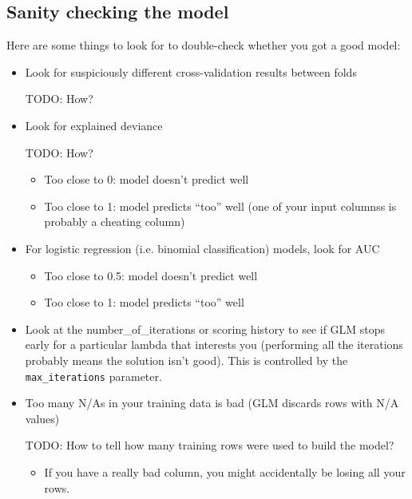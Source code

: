 \subsection{Sanity checking the model}

Here are some things to look for to double-check whether you got a good model:

\begin{itemize}
\item Look for suspiciously different cross-validation results between folds

TODO: How?

\item Look for explained deviance

TODO: How?

      \begin{itemize}
      \item Too close to 0:  model doesn’t predict well
      \item Too close to 1:  model predicts “too” well (one of your input columnss is probably a cheating column)
      \end{itemize}
\item For logistic regression (i.e. binomial classification) models, look for AUC
      \begin{itemize}
      \item Too close to 0.5:  model doesn’t predict well
      \item Too close to 1:  model predicts “too” well
      \end{itemize}
\item Look at the number\_of\_iterations or scoring history to see if GLM stops early for a particular
      lambda that interests you (performing all the iterations probably means the solution isn’t good).  This is
      controlled by the \texttt{max\_iterations} parameter.
\item Too many N/As in your training data is bad (GLM discards rows with N/A values)

TODO: How to tell how many training rows were used to build the model?

      \begin{itemize}
      \item If you have a really bad column, you might accidentally be losing all your rows.
      \end{itemize}
\end{itemize}


